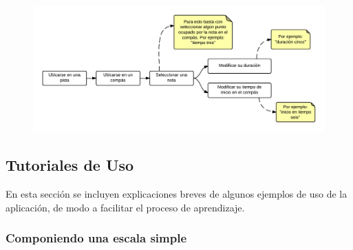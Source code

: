 \begin{figure}[H]
\includegraphics[width=0.9\linewidth]{./graphics/pasos-modificar-nota-seleccionar.png}
\end{figure}

\subsection{Tutoriales de Uso}
En esta secci\'on se incluyen explicaciones breves de algunos ejemplos de uso de la aplicaci\'on, de modo a facilitar el proceso de aprendizaje.

\subsubsection{Componiendo una escala simple}

